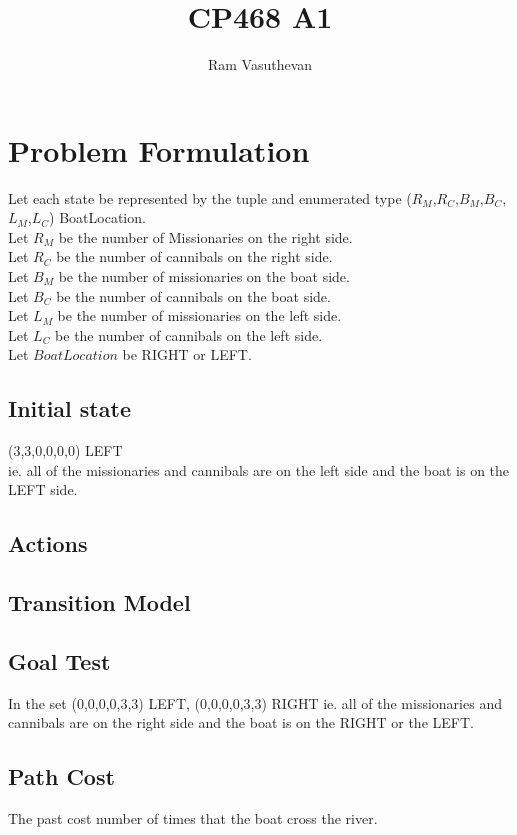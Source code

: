 \documentclass{article}
\title{CP468 A1}
\author{Ram Vasuthevan}
\begin{document}
\maketitle
\newpage

\section{Problem Formulation}

Let each state be represented by the tuple and enumerated type ($R_M$,$R_C$,$B_M$,$B_C$,$L_M$,$L_C$) BoatLocation. \\

\noindent Let $R_M$ be the number of Missionaries on the right side.\\
Let $R_C$ be the number of cannibals on the right side.\\
Let $B_M$ be the number of missionaries on the boat side.\\
Let $B_C$ be the number of cannibals on the boat side.\\
Let $L_M$ be the number of missionaries on the left side.\\
Let $L_C$ be the number of cannibals on the left side.\\
Let $BoatLocation$ be RIGHT or LEFT.\\

\subsection{Initial state}
    (3,3,0,0,0,0) LEFT \\
    ie. all of the missionaries and cannibals are on the left side and the boat is on the LEFT side.

\subsection{Actions}
\subsection{Transition Model}
\subsection{Goal Test}
    In the set {(0,0,0,0,3,3) LEFT, (0,0,0,0,3,3) RIGHT}
    ie. all of the missionaries and cannibals are on the right side and the boat is on the RIGHT or the LEFT.
\subsection{Path Cost}
    The past cost number of times that the boat cross the river.
\end{document}
